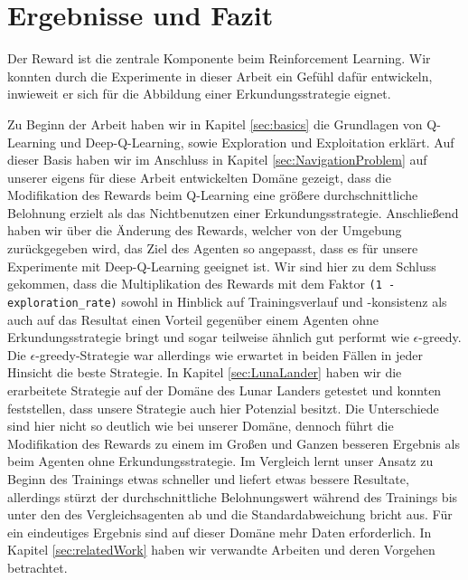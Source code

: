\chapter{Ergebnisse und Fazit} \label{sec:conclusion}
Der Reward ist die zentrale Komponente beim Reinforcement Learning. Wir konnten durch die Experimente in dieser Arbeit ein Gefühl dafür entwickeln, inwieweit er sich für die Abbildung einer Erkundungsstrategie eignet.

Zu Beginn der Arbeit haben wir in Kapitel \ref{sec:basics} die Grundlagen von Q-Learning und Deep-Q-Learning, sowie Exploration und Exploitation erklärt. Auf dieser Basis haben wir im Anschluss in Kapitel \ref{sec:NavigationProblem} auf unserer eigens für diese Arbeit entwickelten Domäne gezeigt, dass die Modifikation des Rewards beim Q-Learning eine größere durchschnittliche Belohnung erzielt als das Nichtbenutzen einer Erkundungsstrategie. Anschließend haben wir über die Änderung des Rewards, welcher von der Umgebung zurückgegeben wird, das Ziel des Agenten so angepasst, dass es für unsere Experimente mit Deep-Q-Learning geeignet ist. Wir sind hier zu dem Schluss gekommen, dass die Multiplikation des Rewards mit dem Faktor \texttt{(1 - exploration_rate)} sowohl in Hinblick auf Trainingsverlauf und -konsistenz als auch auf das Resultat einen Vorteil gegenüber einem Agenten ohne Erkundungsstrategie bringt und sogar teilweise ähnlich gut performt wie $ \epsilon $-greedy. Die $ \epsilon $-greedy-Strategie war allerdings wie erwartet in beiden Fällen in jeder Hinsicht die beste Strategie. In Kapitel \ref{sec:LunaLander} haben wir die erarbeitete Strategie auf der Domäne des Lunar Landers getestet und konnten feststellen, dass unsere Strategie auch hier Potenzial besitzt. Die Unterschiede sind hier nicht so deutlich wie bei unserer Domäne, dennoch führt die Modifikation des Rewards zu einem im Großen und Ganzen besseren Ergebnis als beim Agenten ohne Erkundungsstrategie. Im Vergleich lernt unser Ansatz zu Beginn des Trainings etwas schneller und liefert etwas bessere Resultate, allerdings stürzt der durchschnittliche Belohnungswert während des Trainings bis unter den des Vergleichsagenten ab und die Standardabweichung bricht aus. Für ein eindeutiges Ergebnis sind auf dieser Domäne mehr Daten erforderlich. In Kapitel \ref{sec:relatedWork} haben wir verwandte Arbeiten und deren Vorgehen betrachtet. 

